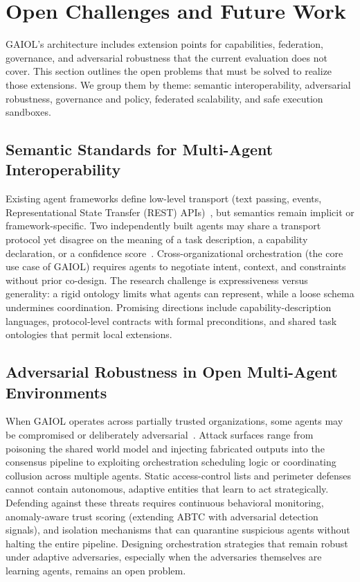 \documentclass{iopjournal}
\begin{document}
\section{Open Challenges and Future Work}
\label{sec:gaps}

GAIOL's architecture includes extension points for capabilities, federation, governance, and adversarial robustness that the current evaluation does not cover. This section outlines the open problems that must be solved to realize those extensions. We group them by theme: semantic interoperability, adversarial robustness, governance and policy, federated scalability, and safe execution sandboxes.

\subsection{Semantic Standards for Multi-Agent Interoperability}

Existing agent frameworks define low-level transport (text passing, events, Representational State Transfer (REST) APIs)~\cite{AutoGen, CAMEL, MetaGPT}, but semantics remain implicit or framework-specific. Two independently built agents may share a transport protocol yet disagree on the meaning of a task description, a capability declaration, or a confidence score~\cite{dong2024large}. Cross-organizational orchestration (the core use case of GAIOL) requires agents to negotiate intent, context, and constraints without prior co-design. The research challenge is expressiveness versus generality: a rigid ontology limits what agents can represent, while a loose schema undermines coordination. Promising directions include capability-description languages, protocol-level contracts with formal preconditions, and shared task ontologies that permit local extensions.

\subsection{Adversarial Robustness in Open Multi-Agent Environments}

When GAIOL operates across partially trusted organizations, some agents may be compromised or deliberately adversarial~\cite{Weidinger, RedTeaming}. Attack surfaces range from poisoning the shared world model and injecting fabricated outputs into the consensus pipeline to exploiting orchestration scheduling logic or coordinating collusion across multiple agents. Static access-control lists and perimeter defenses cannot contain autonomous, adaptive entities that learn to act strategically. Defending against these threats requires continuous behavioral monitoring, anomaly-aware trust scoring (extending ABTC with adversarial detection signals), and isolation mechanisms that can quarantine suspicious agents without halting the entire pipeline. Designing orchestration strategies that remain robust under adaptive adversaries, especially when the adversaries themselves are learning agents, remains an open problem.
\end{document}
